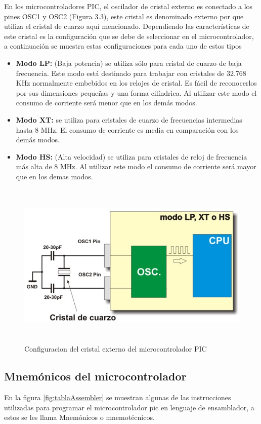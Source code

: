 \documentclass[12pt,a4paper]{article}
\begin{document}
En los microcontroladores PIC, el oscilador de cristal externo es conectado a los pines OSC1 y OSC2 (Figura 3.3), este cristal es denominado externo por que utiliza el cristal de cuarzo aquí mencionado. Dependiendo las características de este cristal es la configuración que se debe de seleccionar en el microcontrolador, a continuación se muestra estas configuraciones para cada uno de estos tipos\cite{Muha}

   \begin{itemize}
   \item \textbf{Modo LP: }(Baja potencia) se utiliza sólo para cristal de cuarzo de baja frecuencia. Este modo está destinado para trabajar con cristales de 32.768 KHz normalmente embebidos en los relojes de cristal. Es fácil de reconocerlos por sus dimensiones pequeñas y una forma cilíndrica. Al utilizar este modo el consumo de corriente será menor que en los demás modos.
   \item \textbf{Modo XT: }se utiliza para cristales de cuarzo de frecuencias intermedias hasta 8 MHz. El consumo de corriente es media en comparación con los demás modos.
   \item \textbf{Modo HS: }(Alta velocidad) se utiliza para cristales de reloj de frecuencia más alta de 8 MHz. Al utilizar este modo el consumo de corriente será mayor que en los demas modos.
   \end{itemize}
   
   \begin{figure}[htpb]
   \centering
   \includegraphics[height=8cm]{OSC}
   \caption{Configuracion del cristal externo del microcontrolador PIC}
   \end{figure}
   
   \subsection{Mnemónicos del microcontrolador}
   En la figura \ref{fig:tablaAssembler} se muestran algunas de las instrucciones utilizadas para programar el microcontrolador pic en lenguaje de ensamblador, a estos se les llama Mnemónicos o mnemotécnicos. 
   
\end{document}
